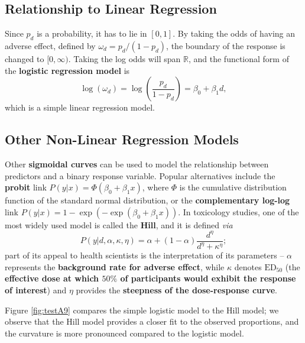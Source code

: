 \subsection{Relationship to Linear Regression}
Since $p_{d}$ is a probability, it has to lie in $[0,1]$. By taking the odds of having an adverse effect, defined by $\omega_{d}=p_{d}/(1-p_{d})$, the boundary of the response is changed to $[0,\infty)$. Taking the log odds will span $\mathbb{R}$, and the functional form of the \textbf{logistic regression model} is 
\begin{equation} \label{eq:logit}
    \log(\omega_{d})=\log\left(\frac{p_{d}}{1-p_{d}}\right)=\beta_{0}+\beta_{1}d,
\end{equation}
which is a simple linear regression model.

\subsection{Other Non-Linear Regression Models}
Other \textbf{sigmoidal curves} can be used to model the relationship between predictors and a binary response variable. Popular alternatives include the \textbf{probit} link $P(y|x)=\Phi(\beta_{0}+\beta_{1}x)$, where $\Phi$ is the cumulative distribution function of the standard normal distribution, or the \textbf{complementary log-log} link $P(y|x)=1-\exp(-\exp(\beta_{0}+\beta_{1}x))$. In toxicology studies, one of the most widely used model is called the \textbf{Hill}, and it is defined \textit{via} 
\begin{equation*}
    P(y|d,\alpha, \kappa, \eta)=\alpha + (1-\alpha)\frac{d^{\eta}}{d^{\eta}+\kappa^{\eta}};
\end{equation*}
part of its appeal to health scientists is the interpretation of its parameters -- $\alpha$ represents the \textbf{background rate for adverse effect}, while $\kappa$ denotes $\textrm{ED}_{50}$ (the \textbf{effective dose at which $50\%$ of participants would exhibit the response of interest}) and $\eta$ provides the \textbf{steepness of the dose-response curve}. \par Figure \ref{fig:testA9} compares the simple logistic model to the Hill model; we observe that the Hill model provides a closer fit to the observed proportions, and the curvature is more pronounced compared to the logistic model.


